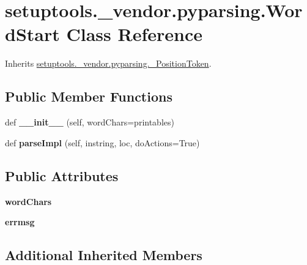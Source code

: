 \hypertarget{classsetuptools_1_1__vendor_1_1pyparsing_1_1_word_start}{}\section{setuptools.\+\_\+vendor.\+pyparsing.\+Word\+Start Class Reference}
\label{classsetuptools_1_1__vendor_1_1pyparsing_1_1_word_start}


Inherits \hyperlink{classsetuptools_1_1__vendor_1_1pyparsing_1_1___position_token}{setuptools.\+\_\+vendor.\+pyparsing.\+\_\+\+Position\+Token}.

\subsection*{Public Member Functions}
\begin{DoxyCompactItemize}
\item 
\mbox{\label{classsetuptools_1_1__vendor_1_1pyparsing_1_1_word_start_a0a024c22e76cec265febde6079752d71}} 
def {\bfseries \+\_\+\+\_\+init\+\_\+\+\_\+} (self, word\+Chars=printables)
\item 
\mbox{\label{classsetuptools_1_1__vendor_1_1pyparsing_1_1_word_start_a2d8d791c73a75427d597bdc7a7de8e0c}} 
def {\bfseries parse\+Impl} (self, instring, loc, do\+Actions=True)
\end{DoxyCompactItemize}
\subsection*{Public Attributes}
\begin{DoxyCompactItemize}
\item 
\mbox{\label{classsetuptools_1_1__vendor_1_1pyparsing_1_1_word_start_a60a6ec3f13aebc95e8f67771765ca6cf}} 
{\bfseries word\+Chars}
\item 
\mbox{\label{classsetuptools_1_1__vendor_1_1pyparsing_1_1_word_start_ae6fee1a4db4b49e5cbf4ca20951b7269}} 
{\bfseries errmsg}
\end{DoxyCompactItemize}
\subsection*{Additional Inherited Members}


